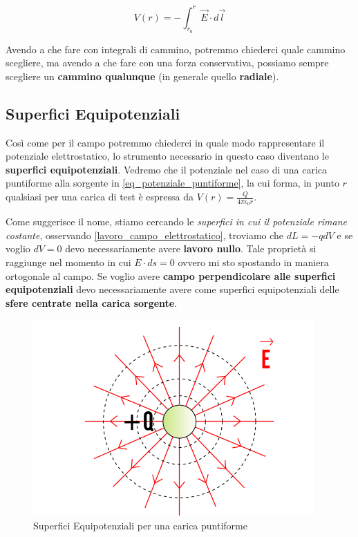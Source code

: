 \begin{large}
\begin{equation}\label{eq_calcolo_potenziale_2}
	V(r)  = -\int_{r_0}^{r} \vec{E} \cdot d\vec{l}
\end{equation}
\end{large}

Avendo a che fare con integrali di cammino, potremmo chiederci quale cammino scegliere, ma avendo a che fare con una forza conservativa, possiamo sempre scegliere un \textbf{cammino qualunque} (in generale quello \textbf{radiale}). 

\subsection{Superfici Equipotenziali} 
Così come per il campo potremmo chiederci in quale modo rappresentare il potenziale elettrostatico, lo strumento necessario in questo caso diventano le \textbf{superfici equipotenziali}.  Vedremo che il potenziale nel caso di una carica puntiforme alla sorgente in \ref{eq_potenziale_puntiforme}, la cui forma, in punto $r$ qualsiasi per una carica di test è espressa da $V(r) = \frac{Q}{4\pi\epsilon_0 r}$.

Come suggerisce il nome, stiamo cercando le \textit{superfici in cui il potenziale rimane costante}, osservando \ref{lavoro_campo_elettrostatico}, troviamo che $dL = -qdV$ e se voglio $dV = 0$ devo necessariamente avere \textbf{lavoro nullo}. Tale proprietà si raggiunge nel momento in cui $E \cdot ds = 0$ ovvero mi sto spostando in maniera ortogonale al campo. Se voglio avere \textbf{campo perpendicolare alle superfici equipotenziali } devo necessariamente avere come superfici equipotenziali delle \textbf{sfere centrate nella carica sorgente}.

\begin{figure}[ht]
	\centering
	\includegraphics[width=0.7\linewidth]{Media/Sup_Equipotenziali}
	\caption{Superfici Equipotenziali per una carica puntiforme}
	\label{fig:supequipotenziali}
\end{figure}


